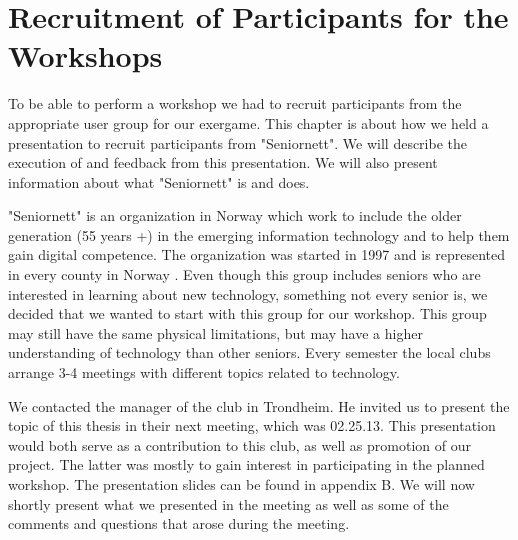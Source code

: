 \chapter{Recruitment of Participants for the Workshops}
To be able to perform a workshop we had to recruit participants from the appropriate user group for our exergame. This chapter is about how we held a presentation to recruit participants from "Seniornett". We  will describe the execution of and feedback from this presentation. We will also present information about what "Seniornett" is and does.  

"Seniornett" is an organization in Norway which work to include the older generation (55 years +) in the emerging information technology and to help them gain digital competence. The organization was started in 1997 and is represented in every county in Norway \cite{seniornett}. Even though this group includes seniors who are interested in learning about new technology, something not every senior is, we decided that we wanted to start with this group for our workshop. This group may still have the same physical limitations, but may have a higher understanding of technology than other seniors. Every semester the local clubs arrange 3-4 meetings with different topics related to technology.

We contacted the manager of the club in Trondheim. He invited us to present the topic of this thesis in their next meeting, which was 02.25.13. This presentation would both serve as a contribution to this club, as well as promotion of our project. The latter was mostly to gain interest in participating in the planned workshop. The presentation slides can be found in appendix B. We will now shortly present what we presented in the meeting as well as some of the comments and questions that arose during the meeting. 

